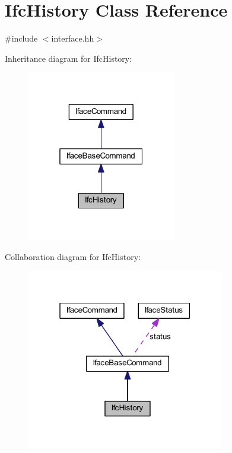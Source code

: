\hypertarget{class_ifc_history}{}\section{Ifc\+History Class Reference}
\label{class_ifc_history}


{\ttfamily \#include $<$interface.\+hh$>$}



Inheritance diagram for Ifc\+History\+:
\nopagebreak
\begin{figure}[H]
\begin{center}
\leavevmode
\includegraphics[width=184pt]{class_ifc_history__inherit__graph}
\end{center}
\end{figure}


Collaboration diagram for Ifc\+History\+:
\nopagebreak
\begin{figure}[H]
\begin{center}
\leavevmode
\includegraphics[width=244pt]{class_ifc_history__coll__graph}
\end{center}
\end{figure}
